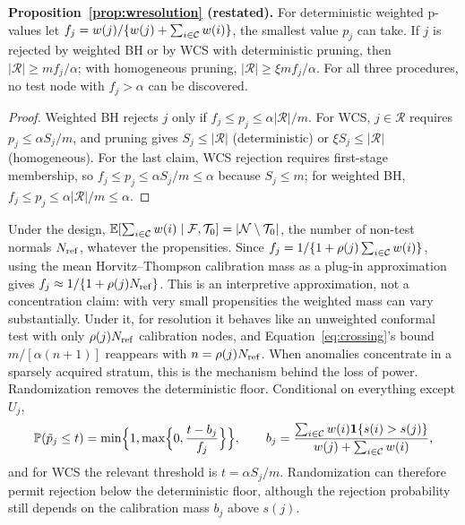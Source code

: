 \medskip\noindent\textbf{Proposition~\ref{prop:wresolution} (restated).} For deterministic weighted p-values let $f_j=w(j)/\{w(j)+\sum_{i\in\mathcal{C}}w(i)\}$, the smallest value $p_j$ can take. If $j$ is rejected by weighted BH or by WCS with deterministic pruning, then $|\mathcal R|\ge mf_j/\alpha$; with homogeneous pruning, $|\mathcal R|\ge\xi mf_j/\alpha$. For all three procedures, no test node with $f_j>\alpha$ can be discovered.
\begin{proof}
Weighted BH rejects $j$ only if $f_j\le p_j\le\alpha|\mathcal R|/m$. For WCS, $j\in\mathcal R$ requires $p_j\le\alpha S_j/m$, and pruning gives $S_j\le|\mathcal R|$ (deterministic) or $\xi S_j\le|\mathcal R|$ (homogeneous). For the last claim, WCS rejection requires first-stage membership, so $f_j\le p_j\le\alpha S_j/m\le\alpha$ because $S_j\le m$; for weighted BH, $f_j\le p_j\le\alpha|\mathcal R|/m\le\alpha$.
\end{proof}
Under the design, $\mathbb{E}[\sum_{i\in\mathcal{C}}w(i)\mid\mathcal F,\mathcal{T}_0]=|\mathcal N\setminus\mathcal{T}_0|$, the number of non-test normals $N_{\rm ref}$, whatever the propensities. Since $f_j=1/\{1+\rho(j)\sum_{i\in\mathcal{C}}w(i)\}$, using the mean Horvitz--Thompson calibration mass as a plug-in approximation gives $f_j\approx1/\{1+\rho(j)N_{\rm ref}\}$. This is an interpretive approximation, not a concentration claim: with very small propensities the weighted mass can vary substantially. Under it, for resolution it behaves like an unweighted conformal test with only $\rho(j)N_{\rm ref}$ calibration nodes, and Equation~\eqref{eq:crossing}'s bound $m/[\alpha(n+1)]$ reappears with $n=\rho(j)N_{\rm ref}$. When anomalies concentrate in a sparsely acquired stratum, this is the mechanism behind the loss of power. Randomization removes the deterministic floor. Conditional on everything except $U_j$,
\[
\mathbb{P}(\tilde p_j\le t)=\min\Bigl\{1,\max\Bigl\{0,\frac{t-b_j}{f_j}\Bigr\}\Bigr\},\qquad
b_j=\frac{\sum_{i\in\mathcal{C}}w(i)\mathbf{1}\{s(i)>s(j)\}}{w(j)+\sum_{i\in\mathcal{C}}w(i)},
\]
and for WCS the relevant threshold is $t=\alpha S_j/m$. Randomization can therefore permit rejection below the deterministic floor, although the rejection probability still depends on the calibration mass $b_j$ above $s(j)$.
